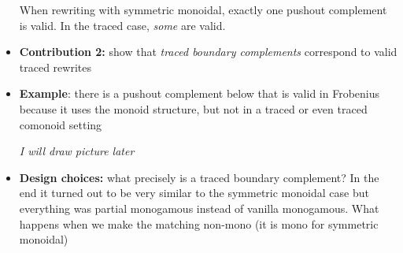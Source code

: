 \begin{itemize}
        When rewriting with symmetric monoidal, exactly one pushout complement
        is valid.
        In the traced case, \emph{some} are valid.
    \item \textbf{Contribution 2:} show that \emph{traced boundary complements}
        correspond to valid traced rewrites
    \item \textbf{Example}: there is a pushout complement below that is valid
        in Frobenius because it uses the monoid structure, but not in a
        traced or even traced comonoid setting
    \begin{center}
        \emph{I will draw picture later}
    \end{center}
    \item \textbf{Design choices:} what precisely is a traced boundary
        complement? In the end it turned out to be very similar to the symmetric
        monoidal case but everything was partial monogamous instead of vanilla
        monogamous. What happens when we make the matching non-mono (it is mono
        for symmetric monoidal)
\end{itemize}